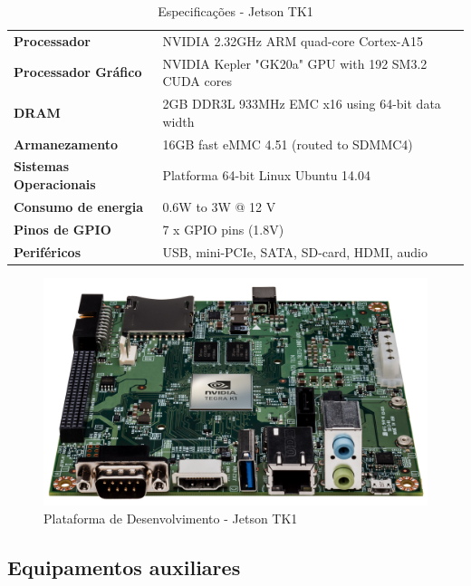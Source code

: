\begin{table}[]
\centering
\caption{Especificações - Jetson TK1}
\label{jetson_tk1_tab}
\begin{tabular}{ll}
\textbf{Processador}           & NVIDIA 2.32GHz ARM quad-core Cortex-A15              \\
\textbf{Processador Gráfico}   & NVIDIA Kepler "GK20a" GPU  with 192 SM3.2 CUDA cores \\
\textbf{DRAM}                  & 2GB DDR3L 933MHz EMC x16 using 64-bit data width     \\
\textbf{Armanezamento}         & 16GB fast eMMC 4.51 (routed to SDMMC4)               \\
\textbf{Sistemas Operacionais} & Platforma 64-bit Linux Ubuntu 14.04                  \\
\textbf{Consumo de energia}    & 0.6W to 3W @ 12 V                                    \\
\textbf{Pinos de GPIO}         & 7 x GPIO pins (1.8V)                                 \\
\textbf{Periféricos}           & USB, mini-PCIe, SATA, SD-card, HDMI, audio          
\end{tabular}
\end{table}

\begin{figure}[H]
	\centering
	\includegraphics[scale=0.10]{./Resources/jetson_tk1.jpg}
	\caption{Plataforma de Desenvolvimento - Jetson TK1}
	\label{jetson_tk1}
\end{figure}


\subsection{Equipamentos auxiliares}

